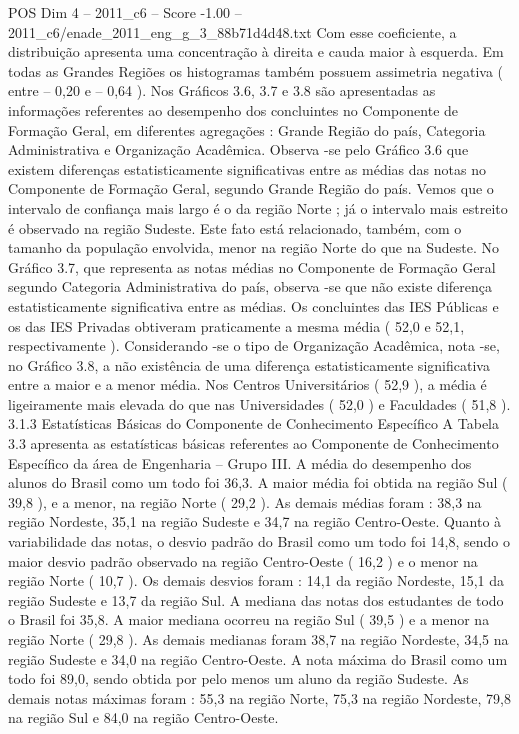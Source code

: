 \begin{textsample}{POS Dim 4 – 2011\_c6 – Score -1.00 – 2011\_c6/enade\_2011\_eng\_g\_3\_88b71d4d48.txt}
Com esse coeficiente, a distribuição apresenta uma concentração à direita e cauda maior à esquerda.
Em todas as Grandes Regiões os histogramas também possuem assimetria negativa ( entre – 0,20 e – 0,64 ).
Nos Gráficos 3.6, 3.7 e 3.8 são apresentadas as informações referentes ao desempenho dos concluintes no Componente de Formação Geral, em diferentes agregações : Grande Região do país, Categoria Administrativa e Organização Acadêmica.
Observa -se pelo Gráfico 3.6 que existem diferenças estatisticamente significativas entre as médias das notas no Componente de Formação Geral, segundo Grande Região do país.
Vemos que o intervalo de confiança mais largo é o da região Norte ; já o intervalo mais estreito é observado na região Sudeste.
Este fato está relacionado, também, com o tamanho da população envolvida, menor na região Norte do que na Sudeste.
No Gráfico 3.7, que representa as notas médias no Componente de Formação Geral segundo Categoria Administrativa do país, observa -se que não existe diferença estatisticamente significativa entre as médias.
Os concluintes das IES Públicas e os das IES Privadas obtiveram praticamente a mesma média ( 52,0 e 52,1, respectivamente ).
Considerando -se o tipo de Organização Acadêmica, nota -se, no Gráfico 3.8, a não existência de uma diferença estatisticamente significativa entre a maior e a menor média.
Nos Centros Universitários ( 52,9 ), a média é ligeiramente mais elevada do que nas Universidades ( 52,0 ) e Faculdades ( 51,8 ). 3.1.3 Estatísticas Básicas do Componente de Conhecimento Específico A Tabela 3.3 apresenta as estatísticas básicas referentes ao Componente de Conhecimento Específico da área de Engenharia – Grupo III.
A média do desempenho dos alunos do Brasil como um todo foi 36,3.
A maior média foi obtida na região Sul ( 39,8 ), e a menor, na região Norte ( 29,2 ).
As demais médias foram : 38,3 na região Nordeste, 35,1 na região Sudeste e 34,7 na região Centro-Oeste.
Quanto à variabilidade das notas, o desvio padrão do Brasil como um todo foi 14,8, sendo o maior desvio padrão observado na região Centro-Oeste ( 16,2 ) e o menor na região Norte ( 10,7 ).
Os demais desvios foram : 14,1 da região Nordeste, 15,1 da região Sudeste e 13,7 da região Sul.
A mediana das notas dos estudantes de todo o Brasil foi 35,8.
A maior mediana ocorreu na região Sul ( 39,5 ) e a menor na região Norte ( 29,8 ).
As demais medianas foram 38,7 na região Nordeste, 34,5 na região Sudeste e 34,0 na região Centro-Oeste.
A nota máxima do Brasil como um todo foi 89,0, sendo obtida por pelo menos um aluno da região Sudeste.
As demais notas máximas foram : 55,3 na região Norte, 75,3 na região Nordeste, 79,8 na região Sul e 84,0 na região Centro-Oeste.

\end{textsample}
